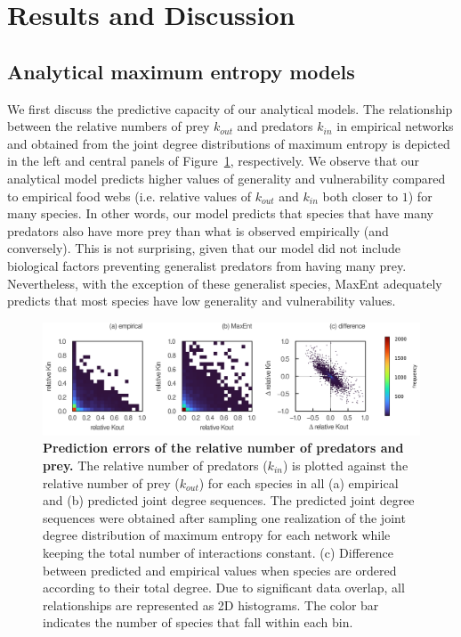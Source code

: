 \clearpage

\section{Results and Discussion}

\subsection{Analytical maximum entropy models}

We first discuss the predictive capacity of our analytical models. The
relationship between the relative numbers of prey $k_{out}$ and predators
$k_{in}$ in empirical networks and obtained from the joint degree distributions
of maximum entropy is depicted in the left and central panels of
Figure~\ref{fig:joint_dd}, respectively. We observe that our analytical model predicts
higher values of generality and vulnerability compared to empirical food webs
(i.e. relative values of $k_{out}$ and $k_{in}$ both closer to $1$) for many
species. In other words, our model predicts that species that have many
predators also have more prey than what is observed empirically (and
conversely). This is not surprising, given that our model did not include
biological factors preventing generalist predators from having many prey.
Nevertheless, with the exception of these generalist species, MaxEnt adequately
predicts that most species have low generality and vulnerability values.

\begin{figure}[!h]
  \centering
  \includegraphics[width=\textwidth]{figures/article2/joint_degree_dist.png}
  \caption{\textbf{Prediction errors of the relative number of predators and prey.}
  The relative number of predators ($k_{in}$) is plotted against the relative
  number of prey ($k_{out}$) for each species in all (a) empirical and (b)
  predicted joint degree sequences. The predicted joint degree sequences were
  obtained after sampling one realization of the joint degree distribution of
  maximum entropy for each network while keeping the total number of
  interactions constant. (c) Difference between predicted and empirical values
  when species are ordered according to their total degree. Due to significant
  data overlap, all relationships are represented as 2D histograms. The color
  bar indicates the number of species that fall within each bin.}
\label{fig:joint_dd}
\end{figure}

